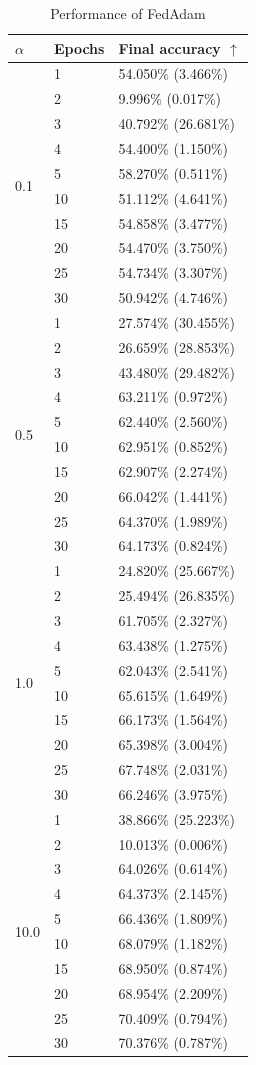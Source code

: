 \documentclass[conference,compsoc]{IEEEtran}
\begin{document}
\begin{table}[ht]
\centering
\caption{Performance of FedAdam}
\begin{tabular}{lll}
\hline
$\alpha$ & \textbf{Epochs} & \textbf{Final accuracy $\uparrow$} \\
\hline
\multirow{10}{*}{0.1} & 1 & 54.050\% (3.466\%) \\
& 2 & 9.996\% (0.017\%) \\
& 3 & 40.792\% (26.681\%) \\
& 4 & 54.400\% (1.150\%) \\
& 5 & 58.270\% (0.511\%) \\
& 10 & 51.112\% (4.641\%) \\
& 15 & 54.858\% (3.477\%) \\
& 20 & 54.470\% (3.750\%) \\
& 25 & 54.734\% (3.307\%) \\
& 30 & 50.942\% (4.746\%) \\
\hline
\multirow{10}{*}{0.5} & 1 & 27.574\% (30.455\%) \\
& 2 & 26.659\% (28.853\%) \\
& 3 & 43.480\% (29.482\%) \\
& 4 & 63.211\% (0.972\%) \\
& 5 & 62.440\% (2.560\%) \\
& 10 & 62.951\% (0.852\%) \\
& 15 & 62.907\% (2.274\%) \\
& 20 & 66.042\% (1.441\%) \\
& 25 & 64.370\% (1.989\%) \\
& 30 & 64.173\% (0.824\%) \\
\hline
\multirow{10}{*}{1.0} & 1 & 24.820\% (25.667\%) \\
& 2 & 25.494\% (26.835\%) \\
& 3 & 61.705\% (2.327\%) \\
& 4 & 63.438\% (1.275\%) \\
& 5 & 62.043\% (2.541\%) \\
& 10 & 65.615\% (1.649\%) \\
& 15 & 66.173\% (1.564\%) \\
& 20 & 65.398\% (3.004\%) \\
& 25 & 67.748\% (2.031\%) \\
& 30 & 66.246\% (3.975\%) \\
\hline
\multirow{10}{*}{10.0} & 1 & 38.866\% (25.223\%) \\
& 2 & 10.013\% (0.006\%) \\
& 3 & 64.026\% (0.614\%) \\
& 4 & 64.373\% (2.145\%) \\
& 5 & 66.436\% (1.809\%) \\
& 10 & 68.079\% (1.182\%) \\
& 15 & 68.950\% (0.874\%) \\
& 20 & 68.954\% (2.209\%) \\
& 25 & 70.409\% (0.794\%) \\
& 30 & 70.376\% (0.787\%) \\
\hline
\end{tabular}
\end{table} 
\end{document}
